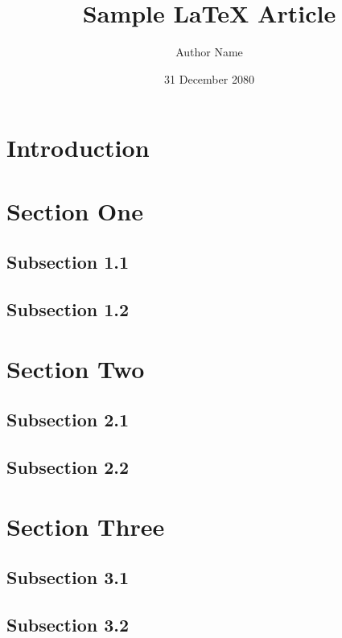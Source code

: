 \documentclass[12pt]{article}
\begin{document}
\title{Sample LaTeX Article}
\author{Author Name}
\date{31 December 2080}
\maketitle

\tableofcontents

\section*{Introduction}
\lipsum[1-2]

\section{Section One}
\subsection{Subsection 1.1}
\lipsum[5-8]

\subsection{Subsection 1.2}
\lipsum[9-12]

\section{Section Two}
\subsection{Subsection 2.1}
\lipsum[13-16]

\subsection{Subsection 2.2}
\lipsum[17-20]

\section{Section Three}
\subsection{Subsection 3.1}
\lipsum[21-24]

\subsection{Subsection 3.2}
\lipsum[25-28]
\end{document}

